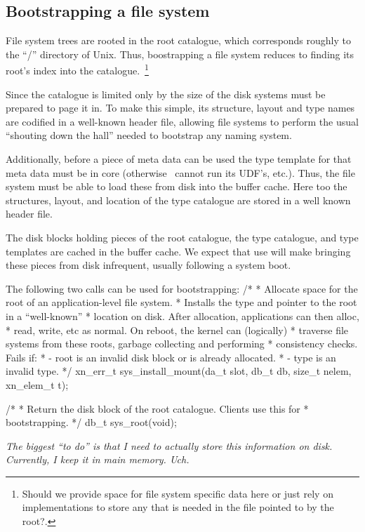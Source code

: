 \subsection{Bootstrapping a file system}

File system trees are rooted in the root catalogue, which corresponds
roughly to the ``/'' directory of Unix.  Thus, boostrapping a file
system reduces to finding its root's index into the
catalogue.~\footnote{Should we provide space for file system specific
data here or just rely on implementations to store any that is needed
in the file pointed to by the root?.}

Since the catalogue is limited only by the size of the disk systems
must be prepared to page it in.  To make this simple, its structure,
layout and type names are codified in a well-known header file,
allowing file systems to perform the usual ``shouting down the hall''
needed to bootstrap any naming system.

Additionally, before a piece of meta data can be used the type template
for that meta data must be in core (otherwise \xxx\ cannot run its UDF's,
etc.).  Thus, the file system must be able to load these from disk into
the buffer cache.  Here too the structures, layout, and location of
the type catalogue are stored in a well known header file.

The disk blocks holding pieces of the root catalogue, the type
catalogue, and type templates are cached in the buffer cache.  We
expect that use will make bringing these pieces from disk infrequent,
usually following a system boot.

The following two calls can be used for bootstrapping:
/*
 * Allocate space for the root of an application-level file system.
 * Installs the type and pointer to the root in a ``well-known''
 * location on disk.  After allocation, applications can then alloc,
 * read, write, etc as normal.  On reboot, the kernel can (logically)
 * traverse file systems from these roots, garbage collecting and performing
 * consistency checks.  Fails if:
 *      - root is an invalid disk block or is already allocated.
 *      - type is an invalid type.
 */
xn_err_t sys_install_mount(da_t slot, db_t db, size_t nelem, xn_elem_t t);

/*
 * Return the disk block of the root catalogue.  Clients use this for
 * bootstrapping.
 */
db_t sys_root(void);

{\em The biggest ``to do'' is that I need to actually store this information
on disk.  Currently, I keep it in main memory.  Uch.}

